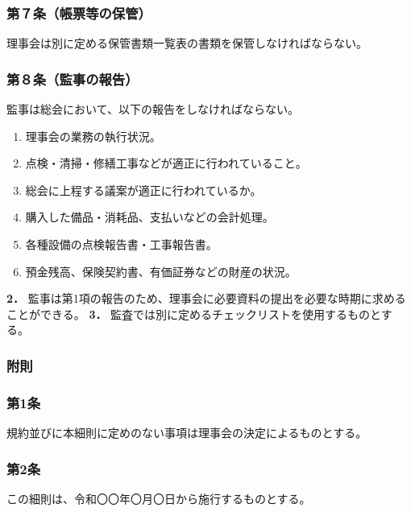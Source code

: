 \documentclass[12pt,uplatex]{jsarticle}
\begin{document}
\subsubsection*{ 第７条（帳票等の保管）}
理事会は別に定める保管書類一覧表の書類を保管しなければならない。\\
\subsubsection*{ 第８条（監事の報告）}
監事は総会において、以下の報告をしなければならない。
\begin{enumerate}
  \item 理事会の業務の執行状況。
  \item 点検・清掃・修繕工事などが適正に行われていること。
  \item 総会に上程する議案が適正に行われているか。
  \item 購入した備品・消耗品、支払いなどの会計処理。
  \item 各種設備の点検報告書・工事報告書。
  \item 預金残高、保険契約書、有価証券などの財産の状況。
\end{enumerate}
\textbf{2．} 監事は第1項の報告のため、理事会に必要資料の提出を必要な時期に求めることができる。
\textbf{3．} 監査では別に定めるチェックリストを使用するものとする。

\begin{center}
\subsubsection*{附則}
\end{center}
\subsubsection*{第1条}
規約並びに本細則に定めのない事項は理事会の決定によるものとする。
\subsubsection*{第2条}
この細則は、令和〇〇年〇月〇日から施行するものとする。

\end{document}
